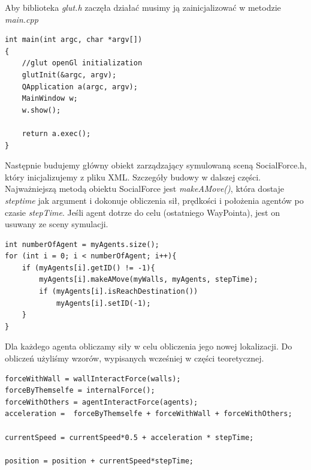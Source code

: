 Aby biblioteka \emph{glut.h} zaczęła działać musimy ją zainicjalizować w metodzie \emph{main.cpp}

\begin{lstlisting}
int main(int argc, char *argv[])
{
    //glut openGl initialization
    glutInit(&argc, argv);
    QApplication a(argc, argv);
    MainWindow w;
    w.show();

    return a.exec();
}
\end{lstlisting}

\hspace{4ex}Następnie budujemy główny obiekt zarządzający symulowaną sceną {SocialForce.h}, który inicjalizujemy z pliku XML. Szczegóły budowy w dalszej części. Najważniejszą metodą obiektu SocialForce jest \emph{makeAMove()}, która dostaje \emph{steptime} jak argument i dokonuje obliczenia sił, prędkości i położenia agentów po czasie \emph{stepTime}. Jeśli agent dotrze do celu (ostatniego WayPointa), jest on usuwany ze sceny symulacji.

\begin{lstlisting}
int numberOfAgent = myAgents.size();
for (int i = 0; i < numberOfAgent; i++){
	if (myAgents[i].getID() != -1){
        myAgents[i].makeAMove(myWalls, myAgents, stepTime);
        if (myAgents[i].isReachDestination())
            myAgents[i].setID(-1);
    }
}
\end{lstlisting}
\hspace{4ex}Dla każdego agenta obliczamy siły w celu obliczenia jego nowej lokalizacji. Do obliczeń użyliśmy wzorów, wypisanych wcześniej w części teoretycznej.

\begin{lstlisting}
forceWithWall = wallInteractForce(walls);
forceByThemselfe = internalForce();
forceWithOthers = agentInteractForce(agents);
acceleration =  forceByThemselfe + forceWithWall + forceWithOthers;

currentSpeed = currentSpeed*0.5 + acceleration * stepTime;
 
position = position + currentSpeed*stepTime;
\end{lstlisting}


